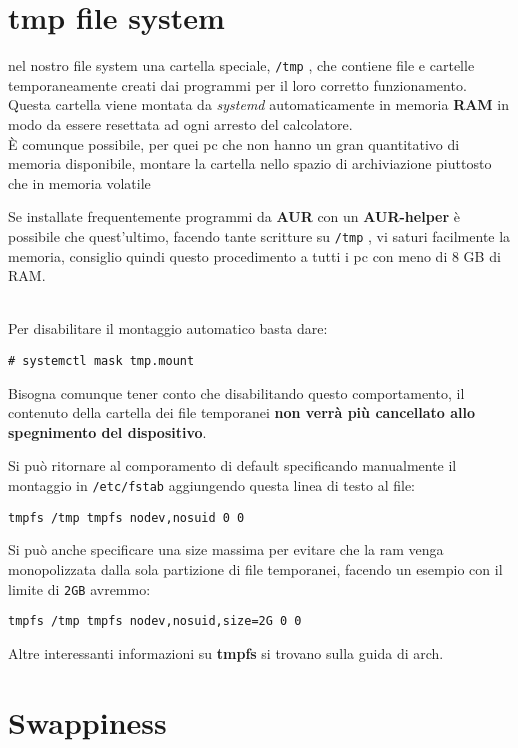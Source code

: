 \documentclass[twoside,italian]{book}
\newcommand{\nlinea}{
	\leavevmode
	\\
}
\newcommand{\centcode}[1]{
	
	\definecolor{centcode}{rgb}{0.5,0.1,0.1}
	
	\begin{center}
	 	\texttt{\textcolor{centcode}{#1}}
	\end{center}
	
	
}
\newcommand{\code}[1]{
	\texttt{\textcolor{code}{#1}}
}
\begin{document}
		\section{tmp file system}
			
			nel nostro file system una cartella speciale, \code{/tmp}, che contiene file e cartelle temporaneamente creati dai programmi per il loro corretto funzionamento. Questa cartella viene montata da \textit{systemd} automaticamente in memoria \textbf{RAM } in modo da essere resettata ad ogni arresto del calcolatore.\\
			È comunque possibile, per quei pc che non hanno un gran quantitativo di memoria disponibile, montare la cartella nello spazio di archiviazione piuttosto che in memoria volatile
			
			\begin{tcolorbox}[floatplacement=b,width=\textwidth,colback={white},title={ATTENZIONE:},colbacktitle=red,coltitle=white,colupper=red]
				Se installate frequentemente programmi da \textbf{AUR} con un \textbf{AUR-helper} è possibile che quest'ultimo, facendo tante scritture su \code{/tmp}, vi saturi facilmente la memoria, consiglio quindi questo procedimento a tutti i pc con meno di 8 GB di RAM.
			\end{tcolorbox}
			\nlinea
			Per disabilitare il montaggio automatico basta dare:
			\centcode{\# systemctl mask tmp.mount}
			
			Bisogna comunque tener conto che disabilitando questo comportamento, il contenuto della cartella dei file temporanei \textbf{non verrà più cancellato allo spegnimento del dispositivo}.
			
			Si può ritornare al comporamento di default specificando manualmente il montaggio in \code{/etc/fstab} aggiungendo questa linea di testo al file:
			\centcode{tmpfs   /tmp         tmpfs   nodev,nosuid          0  0}
			
			Si può anche specificare una size massima per evitare che la ram venga monopolizzata dalla sola partizione di file temporanei, facendo un esempio con il limite di \code{2GB} avremmo:
			\centcode{tmpfs   /tmp         tmpfs   nodev,nosuid,size=2G          0  0}
			
			Altre interessanti informazioni su \textbf{tmpfs} si trovano sulla guida di arch.
				
			
		\section{Swappiness}
			
\end{document}
